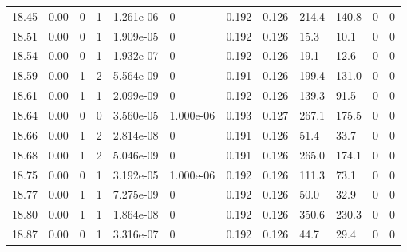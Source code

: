 \documentclass[preview]{standalone}
\begin{document}
{{{{{{{{{{{{{{\begin{tabular}{L{1.2cm}C{1.2cm} C{0.3cm}C{0.5cm} C{1.4cm}C{1.4cm} C{1.4cm}C{1.4cm} C{1.6cm}C{1.6cm} C{1.6cm}C{1.6cm}}
  18.45  &  0.00  & 0     &  1 &  1.261e-06  & 0  &  0.192&   0.126& 214.4 & 140.8   &  0 & 0  \\ 
  18.51  &  0.00  & 0     &  1 &  1.909e-05  & 0  &  0.192&   0.126& 15.3 & 10.1   &  0 & 0  \\ 
  18.54  &  0.00  & 0     &  1 &  1.932e-07  & 0  &  0.192&   0.126& 19.1 & 12.6   &  0 & 0  \\ 
  18.59  &  0.00  & 1     &  2 &  5.564e-09  & 0  &  0.191&   0.126& 199.4 & 131.0   &  0 & 0  \\ 
  18.61  &  0.00  & 1     &  1 &  2.099e-09  & 0  &  0.192&   0.126& 139.3 & 91.5   &  0 & 0  \\ 
  18.64  &  0.00  & 0     &  0 &  3.560e-05  & 1.000e-06  &  0.193&   0.127& 267.1 & 175.5   &  0 & 0  \\ 
  18.66  &  0.00  & 1     &  2 &  2.814e-08  & 0  &  0.191&   0.126& 51.4 & 33.7   &  0 & 0  \\ 
  18.68  &  0.00  & 1     &  2 &  5.046e-09  & 0  &  0.191&   0.126& 265.0 & 174.1   &  0 & 0  \\ 
  18.75  &  0.00  & 0     &  1 &  3.192e-05  & 1.000e-06  &  0.192&   0.126& 111.3 & 73.1   &  0 & 0  \\ 
  18.77  &  0.00  & 1     &  1 &  7.275e-09  & 0  &  0.192&   0.126& 50.0 & 32.9   &  0 & 0  \\ 
  18.80  &  0.00  & 1     &  1 &  1.864e-08  & 0  &  0.192&   0.126& 350.6 & 230.3   &  0 & 0  \\ 
  18.87  &  0.00  & 0     &  1 &  3.316e-07  & 0  &  0.192&   0.126& 44.7 & 29.4   &  0 & 0  \\ 
\hline 
\end{tabular} 

}}}}}}}}}}}}}}
\end{document}
